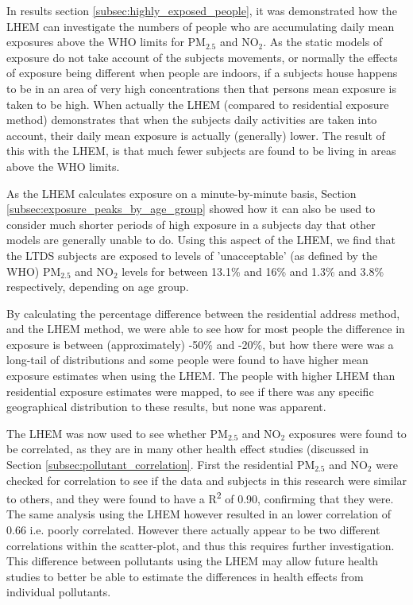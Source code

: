 
In results section \ref{subsec:highly_exposed_people}, it was demonstrated how the LHEM can investigate the numbers of people who are accumulating daily mean exposures above the WHO limits for PM$_{2.5}$ and NO$_{2}$. As the static models of exposure do not take account of the subjects movements, or normally the effects of exposure being different when people are indoors, if a subjects house happens to be in an area of very high concentrations then that persons mean exposure is taken to be high. When actually the LHEM (compared to residential exposure method) demonstrates that when the subjects daily activities are taken into account, their daily mean exposure is actually (generally) lower. The result of this with the LHEM, is that much fewer subjects are found to be living in areas above the WHO limits.


As the LHEM calculates exposure on a minute-by-minute basis, Section \ref{subsec:exposure_peaks_by_age_group} showed how it can also be used to consider much shorter periods of high exposure in a subjects day that other models are generally unable to do. Using this aspect of the LHEM, we find that the LTDS subjects are exposed to levels of 'unacceptable' (as defined by the WHO) PM$_{2.5}$ and NO$_{2}$ levels for between 13.1\% and 16\% and 1.3\% and 3.8\% respectively, depending on age group.


By calculating the percentage difference between the residential address method, and the LHEM method, we were able to see how for most people the difference in exposure is between (approximately) -50\% and -20\%, but how there were was a long-tail of distributions and some people were found to have higher mean exposure estimates when using the LHEM. The people with higher LHEM than residential exposure estimates were mapped, to see if there was any specific geographical distribution to these results, but none was apparent.


The LHEM was now used to see whether PM$_{2.5}$ and NO$_{2}$ exposures were found to be correlated, as they are in many other health effect studies (discussed in Section \ref{subsec:pollutant_correlation}. First the residential PM$_{2.5}$ and NO$_{2}$ were checked for correlation to see if the data and subjects in this research were similar to others, and they were found to have a R\textsuperscript{2} of 0.90, confirming that they were. The same analysis using the LHEM however resulted in an lower correlation of 0.66 i.e. poorly correlated. However there actually appear to be two different correlations within the scatter-plot, and thus this requires further investigation. This difference between pollutants using the LHEM may allow future health studies to better be able to estimate the differences in health effects from individual pollutants.


